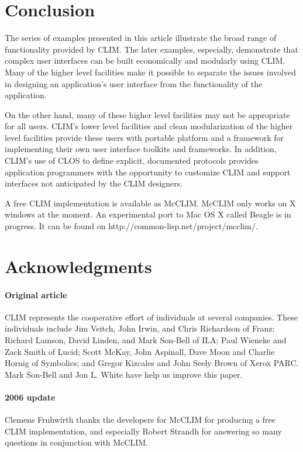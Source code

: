 \documentclass[twocolumn,a4paper]{article}
\newcommand {\code}[1]{{\sffamily #1}}
\newcommand {\CLIM}{{\small CLIM}}
\let\method\code
\begin{document}
% 

\section{Conclusion}

The series of examples presented in this article illustrate the broad range of functionality provided by \CLIM{}. The later examples, especially, demonstrate that complex user interfaces can be built economically and modularly using \CLIM{}. Many of the higher level facilities make it possible to separate the issues involved in designing an application's user interface from the functionality of the application.

On the other hand, many of these higher level facilities may not be appropriate for all users. \CLIM{}'s lower level facilities and clean modularization of the higher level facilities provide these users with portable platform and a framework for implementing their own user interface toolkits and frameworks. In addition, \CLIM{}'s use of CLOS to define explicit, documented protocols provides application programmers with the opportunity to customize \CLIM{} and support interfaces not anticipated by the \CLIM{} designers.

A free \CLIM{} implementation is available as McCLIM. McCLIM only works on X windows at the moment. An experimental port to Mac OS X called Beagle is in progress. It can be found on http://common-lisp.net/project/mcclim/.

\section*{Acknowledgments}

\paragraph*{Original article} \CLIM{} represents the cooperative effort of individuals at several companies. These individuals include Jim Veitch, John Irwin, and Chris Richardson of Franz; Richard Lamson, David Linden, and Mark Son-Bell of ILA; Paul Wieneke and Zack Smith of Lucid; Scott McKay, John Aspinall, Dave Moon and Charlie Hornig of Symbolics; and Gregor Kizcales and John Seely Brown of Xerox PARC. Mark Son-Bell and Jon L. White have help us improve this paper.

\paragraph*{2006 update} Clemens Fruhwirth thanks the developers for McCLIM for producing a free \CLIM{} implementation, and especially Robert Strandh for answering so many questions in conjunction with McCLIM.



\end{document}
